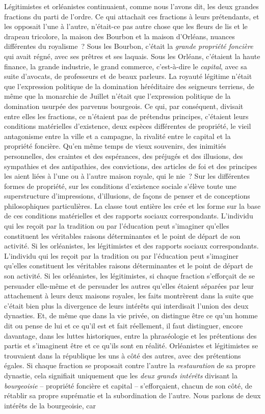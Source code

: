 \documentclass[french,twoside]{book} %
\begin{document}
Légitimistes et orléanistes continuaient, comme nous l’avons dit, les deux grandes fractions du parti de l’ordre. Ce qui attachait ces fractions à leurs prétendants, et les opposait l’une à l’autre, n’était-ce pas autre chose que les fleurs de lis et le drapeau tricolore, la maison des Bourbon et la maison d’Orléans, nuances différentes du royalisme ? Sous les Bourbon, c’était la \emph{grande propriété foncière} qui avait régné, avec ses prêtres et ses laquais. Sous les Orléans, c’étaient la haute finance, la grande industrie, le grand commerce, c’est-à-dire le \emph{capital}, avec sa suite d’avocats, de professeurs et de beaux parleurs. La royauté légitime n’était que l’expression politique de la domination héréditaire des seigneurs terriens, de même que la monarchie de Juillet n’était que l’expression politique de la domination usurpée des parvenus bourgeois. Ce qui, par conséquent, divisait entre elles les fractions, ce n’étaient pas de prétendus principes, c’étaient leurs conditions matérielles d’existence, deux espèces différentes de propriété, le vieil antagonisme entre la ville et a campagne, la rivalité entre le capital et la propriété foncière. Qu’en même temps de vieux souvenirs, des inimitiés personnelles, des craintes et des espérances, des préjugés et des illusions, des sympathies et des antipathies, des convictions, des articles de foi et des principes les aient liées à l’une ou à l’autre maison royale, qui le nie ? Sur les différentes formes de propriété, sur les conditions d’existence sociale s’élève toute une superstructure d’impressions, d’illusions, de façons de penser et de conceptions philosophiques particulières. La classe tout entière les crée et les forme sur la base de ces conditions matérielles et des rapports sociaux correspondants. L’individu qui les reçoit par la tradition ou par l’éducation peut s’imaginer qu’elles constituent les véritables raisons déterminantes et le point de départ de son activité. Si les orléanistes, les légitimistes et des rapports sociaux correspondants. L’individu qui les reçoit par la tradition ou par l’éducation peut s’imaginer qu’elles constituent les véritables raisons déterminantes et le point de départ de son activité. Si les orléanistes, les légitimistes, si chaque fraction s’efforçait de se persuader elle-même et de persuader les autres qu’elles étaient séparées par leur attachement à leurs deux maisons royales, les faits montrèrent dans la suite que c’était bien plus la divergence de leurs intérêts qui interdisait l’union des deux dynasties. Et, de même que dans la vie privée, on distingue être ce qu’un homme dit ou pense de lui et ce qu’il est et fait réellement, il faut distinguer, encore davantage, dans les luttes historiques, entre la phraséologie et les prétentions des partis et s’imaginent être et ce qu’ils sont en réalité. Orléanistes et légitimistes se trouvaient dans la république les uns à côté des autres, avec des prétentions égales. Si chaque fraction se proposait contre l’autre la \emph{restauration} de sa propre dynastie, cela signifiait uniquement que les \emph{deux grands intérêts} divisant la \emph{bourgeoisie} – propriété foncière et capital – s’efforçaient, chacun de son côté, de rétablir sa propre suprématie et la subordination de l’autre. Nous parlons de deux intérêts de la bourgeoisie, car 
\end{document}
